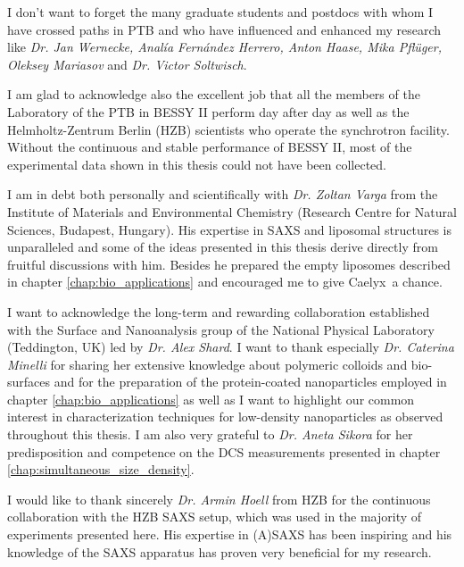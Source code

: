 \noindent I don't want to forget the many graduate students and postdocs with whom I have crossed paths in PTB and who have influenced and enhanced my research like \emph{Dr. Jan Wernecke, Anal\'{i}a Fern\'{a}ndez Herrero, Anton Haase, Mika Pflüger, Oleksey Mariasov} and \emph{Dr. Victor Soltwisch}.
\vspace{2ex}

\noindent I am glad to acknowledge also the excellent job that all the members of the Laboratory of the PTB in BESSY II perform day after day as well as the Helmholtz-Zentrum Berlin (HZB) scientists who operate the synchrotron facility. Without the continuous and stable performance of BESSY II, most of the experimental data shown in this thesis could not have been collected.
\vspace{2ex}

\noindent I am in debt both personally and scientifically with \emph{Dr. Zoltan Varga} from the Institute of Materials and Environmental Chemistry (Research Centre for Natural Sciences, Budapest, Hungary). His expertise in SAXS and liposomal structures is unparalleled and some of the ideas presented in this thesis derive directly from fruitful discussions with him. Besides he prepared the empty liposomes described in chapter \ref{chap:bio_applications} and encouraged me to give Caelyx\textregistered\ a chance.

\vspace{2ex}

\noindent I want to acknowledge the long-term and rewarding collaboration established with the Surface and Nanoanalysis group of the National Physical Laboratory (Teddington, UK) led by \emph{Dr. Alex Shard}. I want to thank especially \emph{Dr. Caterina Minelli} for sharing her extensive knowledge about polymeric colloids and bio-surfaces and for the preparation of the protein-coated nanoparticles employed in chapter \ref{chap:bio_applications} as well as I want to highlight our common interest in characterization techniques for low-density nanoparticles as observed throughout this thesis. I am also very grateful to \emph{Dr. Aneta Sikora} for her predisposition and competence on the DCS measurements presented in chapter \ref{chap:simultaneous_size_density}.
\vspace{2ex}

\noindent I would like to thank sincerely \emph{Dr. Armin Hoell} from HZB for the continuous collaboration with the HZB SAXS setup, which was used in the majority of experiments presented here. His expertise in (A)SAXS has been inspiring and his knowledge of the SAXS apparatus has proven very beneficial for my research.
\vspace{2ex}

